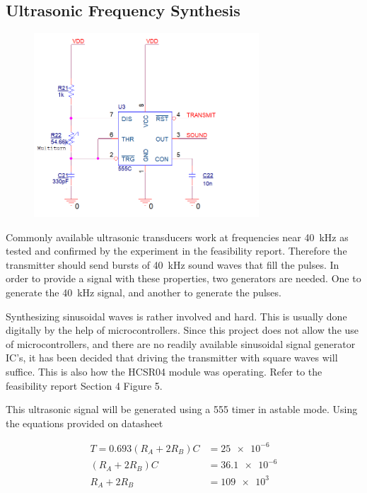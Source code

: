 \documentclass[12pt, a4paper]{article}
\begin{document}
    
    	\subsection{Ultrasonic Frequency Synthesis}

            \begin{figure}[H]\centering
                \includegraphics[width=0.75\textwidth]{schematics/ultra_gen.png}
                \caption[]{}
            \end{figure}
	
	        Commonly available ultrasonic transducers work at frequencies near \SI{40}{\kilo\hertz} as tested and confirmed by the experiment in the feasibility report. Therefore the transmitter should send bursts of \SI{40}{\kilo\hertz} sound waves that fill the pulses. In order to provide a signal with these properties, two generators are needed. One to generate the \SI{40}{\kilo\hertz} signal, and another to generate the pulses.
            
            \bigskip 
            Synthesizing sinusoidal waves is rather involved and hard. This is usually done digitally by the help of microcontrollers. Since this project does not allow the use of microcontrollers, and there are no readily available sinusoidal signal generator IC’s, it has been decided that driving the transmitter with square waves will suffice. This is also how the HCSR04 module was operating. Refer to the feasibility report Section 4 Figure 5.

            This ultrasonic signal will be generated using a 555 timer in astable mode. Using the equations provided on datasheet
            
            \begin{equation}\begin{aligned}
                T = 0.693(R_A + 2R_B)C &= \num{25e-6} \\
                         (R_A + 2R_B)C &= \num{36.1e-6} \\
                          R_A + 2R_B   &= \num{109e3}
            \end{aligned}\end{equation}
\end{document}
